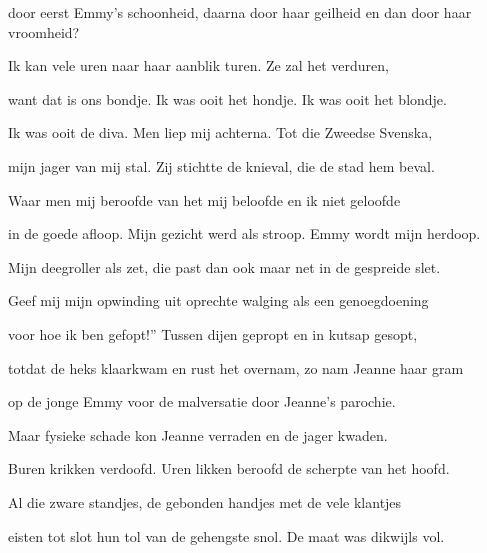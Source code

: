 door eerst Emmy’s schoonheid,
daarna door haar geilheid
en dan door haar vroomheid?

Ik kan vele uren
naar haar aanblik turen.
Ze zal het verduren,

want dat is ons bondje.
Ik was ooit het hondje.
Ik was ooit het blondje.

Ik was ooit de diva.
Men liep mij achterna.
Tot die Zweedse Svenska,

mijn jager van mij stal.
Zij stichtte de knieval,
die de stad hem beval.

Waar men mij beroofde
van het mij beloofde
en ik niet geloofde

in de goede afloop.
Mijn gezicht werd als stroop.
Emmy wordt mijn herdoop.

Mijn deegroller als zet,
die past dan ook maar net
in de gespreide slet.

Geef mij mijn opwinding
uit oprechte walging
als een genoegdoening

voor hoe ik ben gefopt!”
Tussen dijen gepropt
en in kutsap gesopt,

totdat de heks klaarkwam
en rust het overnam,
zo nam Jeanne haar gram

op de jonge Emmy
voor de malversatie
door Jeanne’s parochie.

Maar fysieke schade
kon Jeanne verraden
en de jager kwaden.

Buren krikken verdoofd.
Uren likken beroofd
de scherpte van het hoofd.

Al die zware standjes,
de gebonden handjes
met de vele klantjes

eisten tot slot hun tol
van de gehengste snol.
De maat was dikwijls vol.
